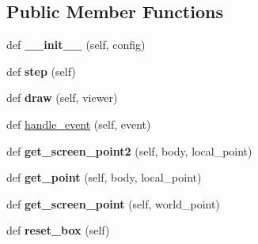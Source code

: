 \subsection*{Public Member Functions}
\begin{DoxyCompactItemize}
\item 
\hypertarget{classaml__robot_1_1box2d_1_1push__world_1_1_push_world_a146869e420165fe44bc622eec15519e5}{}\label{classaml__robot_1_1box2d_1_1push__world_1_1_push_world_a146869e420165fe44bc622eec15519e5} 
def {\bfseries \+\_\+\+\_\+init\+\_\+\+\_\+} (self, config)
\item 
\hypertarget{classaml__robot_1_1box2d_1_1push__world_1_1_push_world_aeb230de4e6b9f7fbf37ad943ff0a68ab}{}\label{classaml__robot_1_1box2d_1_1push__world_1_1_push_world_aeb230de4e6b9f7fbf37ad943ff0a68ab} 
def {\bfseries step} (self)
\item 
\hypertarget{classaml__robot_1_1box2d_1_1push__world_1_1_push_world_af3977d3e5e35a598c4a87a4d4dd55147}{}\label{classaml__robot_1_1box2d_1_1push__world_1_1_push_world_af3977d3e5e35a598c4a87a4d4dd55147} 
def {\bfseries draw} (self, viewer)
\item 
def \hyperlink{classaml__robot_1_1box2d_1_1push__world_1_1_push_world_a3795cb626fde3df305543dbc8d7e2899}{handle\+\_\+event} (self, event)
\item 
\hypertarget{classaml__robot_1_1box2d_1_1push__world_1_1_push_world_a1507e914bbec49dfee9955e75d908127}{}\label{classaml__robot_1_1box2d_1_1push__world_1_1_push_world_a1507e914bbec49dfee9955e75d908127} 
def {\bfseries get\+\_\+screen\+\_\+point2} (self, body, local\+\_\+point)
\item 
\hypertarget{classaml__robot_1_1box2d_1_1push__world_1_1_push_world_a97a78f99fd54df71b9f7ab119e94eb30}{}\label{classaml__robot_1_1box2d_1_1push__world_1_1_push_world_a97a78f99fd54df71b9f7ab119e94eb30} 
def {\bfseries get\+\_\+point} (self, body, local\+\_\+point)
\item 
\hypertarget{classaml__robot_1_1box2d_1_1push__world_1_1_push_world_ab7aeeae63495d3fec016e4a1d29e1ad5}{}\label{classaml__robot_1_1box2d_1_1push__world_1_1_push_world_ab7aeeae63495d3fec016e4a1d29e1ad5} 
def {\bfseries get\+\_\+screen\+\_\+point} (self, world\+\_\+point)
\item 
\hypertarget{classaml__robot_1_1box2d_1_1push__world_1_1_push_world_ad61d5ca8aef619f22511a0961330bedb}{}\label{classaml__robot_1_1box2d_1_1push__world_1_1_push_world_ad61d5ca8aef619f22511a0961330bedb} 
def {\bfseries reset\+\_\+box} (self)
\item 

\end{DoxyCompactItemize}
